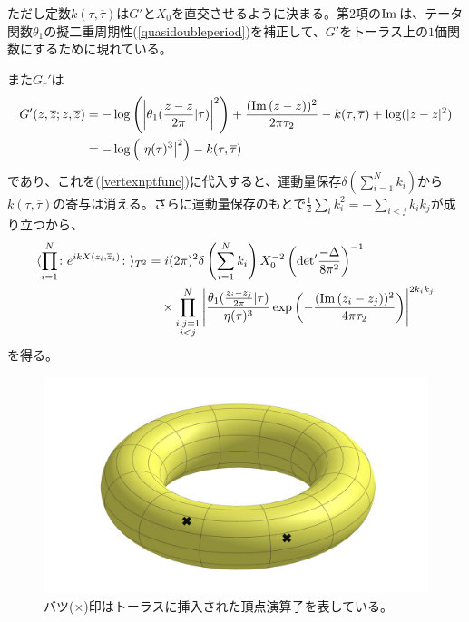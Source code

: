 ただし定数$k(\tau,\overline{\tau})$は$G'$と$X_0$を直交させるように決まる。第$2$項の$\text{Im}\,$は、テータ関数$\theta_1$の擬二重周期性(\ref{quasidoubleperiod})を補正して、$G'$をトーラス上の$1$価関数にするために現れている。

また$G_r'$は
\begin{align}
G'(z,\overline{z};z,\overline{z})&=-\log \left(\left|\theta_1(\frac{z-z}{2\pi}|\tau) \right|^2\right)+\frac{(\text{Im}\,(z-z) )^2}{2\pi\tau_2}-k(\tau,\overline{\tau})+\log(|z-z|^2)\notag\\
&=-\log\left(\left|\eta(\tau)^3\right|^2\right)-k(\tau,\overline{\tau})
\end{align}
であり、これを(\ref{vertexnptfunc})に代入すると、運動量保存$\delta\left(\sum_{i=1}^{N}k_i \right)$から$k(\tau,\overline{\tau})$の寄与は消える。さらに運動量保存のもとで$\frac{1}{2}\sum_i k_i^2=-\sum_{i<j}k_ik_j$が成り立つから、
\begin{align}
\langle \prod_{i=1}^{N} \colon e^{ikX(z_i,\overline{z}_i)}\colon  \rangle_{T^2}&=i(2\pi)^2\delta\left(\sum_{i=1}^{N}k_i \right)X_0^{-2}\left(\text{det}' \frac{-\Delta}{8\pi^2} \right)^{-1}\notag\\
&\quad \times \prod_{\substack{i,j=1\\i<j}}^{N}\left|\frac{\theta_1(\frac{z_i-z_j}{2\pi}|\tau)}{\eta(\tau)^3}\exp\left(-\frac{(\text{Im}\,(z_i-z_j) )^2}{4\pi\tau_2}\right) \right|^{2k_ik_j}
\end{align}
を得る。
\begin{figure}[h]
	\centering
	\includegraphics[width=0.7\linewidth]{torusCF.pdf}
	\caption{バツ($\times$)印はトーラスに挿入された頂点演算子を表している。}
	\label{fig:toruscf}
\end{figure}


